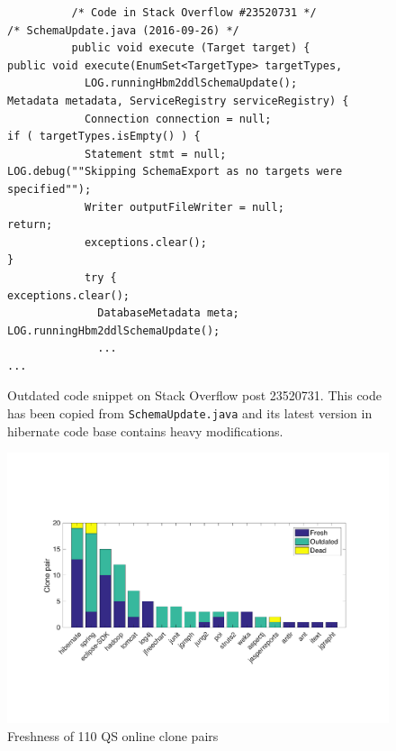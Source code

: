 \documentclass[sigconf,review, anonymous]{acmart}
\begin{document}
\begin{figure}
	\begin{lstlisting}
          /* Code in Stack Overflow #23520731 */             /* SchemaUpdate.java (2016-09-26) */
          public void execute (Target target) {              public void execute(EnumSet<TargetType> targetTypes, 
            LOG.runningHbm2ddlSchemaUpdate();                                Metadata metadata, ServiceRegistry serviceRegistry) {
            Connection connection = null;                      if ( targetTypes.isEmpty() ) {
            Statement stmt = null;                               LOG.debug(""Skipping SchemaExport as no targets were specified"");
            Writer outputFileWriter = null;                      return;
            exceptions.clear();                                }
            try {                                              exceptions.clear();
              DatabaseMetadata meta;                           LOG.runningHbm2ddlSchemaUpdate();
              ...                                              ...
	\end{lstlisting}
	\caption{Outdated code snippet on Stack Overflow post 23520731. This code has been copied from \texttt{SchemaUpdate.java} and its latest version in hibernate code base contains heavy modifications.}
	\label{fig:hibernate_outdated_code}
\end{figure}

\begin{figure}
	\centering
	\includegraphics[width=\linewidth]{freshness}
	\caption{Freshness of 110 QS online clone pairs}
	\label{fig:outdated}
\end{figure}
\end{document}
